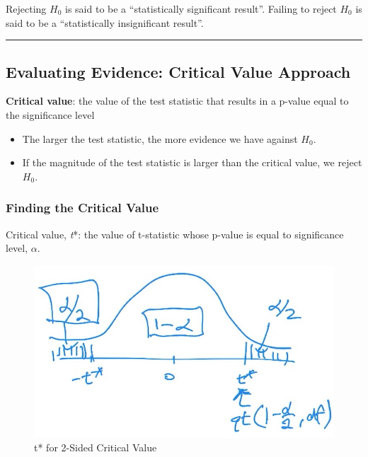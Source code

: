 \documentclass[
  openany]{book}
\providecommand{\tightlist}{%
  \setlength{\itemsep}{0pt}\setlength{\parskip}{0pt}}
\begin{document}
Rejecting \(H_0\) is said to be a ``statistically significant result''. Failing to reject \(H_0\) is said to be a ``statistically insignificant result''.

\begin{center}\rule{0.5\linewidth}{0.5pt}\end{center}

\subsection{Evaluating Evidence: Critical Value Approach}\label{evaluating-evidence-critical-value-approach}

\textbf{Critical value}: the value of the test statistic that results in a p-value equal to the significance level

\begin{itemize}
\tightlist
\item
  The larger the test statistic, the more evidence we have against \(H_0\).
\item
  If the magnitude of the test statistic is larger than the critical value, we reject \(H_0\).
\end{itemize}

\subsubsection{Finding the Critical Value}\label{finding-the-critical-value}

Critical value, \emph{t}*: the value of t-statistic whose p-value is equal to significance level, \(\alpha\).

\begin{figure}

{\centering \includegraphics{images/critval2sided} 

}

\caption{t* for 2-Sided Critical Value}\label{fig:2sidecv}
\end{figure}
\end{document}
